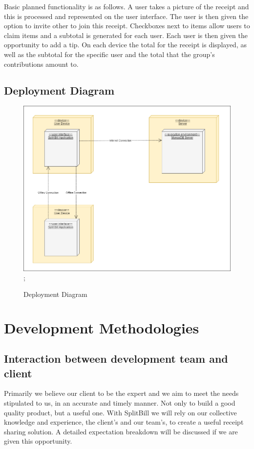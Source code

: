 \documentclass[12pt,a4paper]{article}
\begin{document}
   Basic planned functionality is as follows. A user takes a picture of the receipt and this is processed and represented on the user interface. The user is then given the option to invite other to join this receipt. Checkboxes
   next to items allow users to claim items and a subtotal is generated for each user. Each user is then given the opportunity to add a tip. On each device the total for the receipt is displayed, as well as the subtotal for the
   specific user and the total that the group's contributions amount to.

   \clearpage
   \subsection{Deployment Diagram}
   \begin{figure}[h]
   \includegraphics[width=\textwidth]{SplitBill_deployment.png};
   \caption{Deployment Diagram}
   \end{figure}

   \section{Development Methodologies}
   \subsection{Interaction between development team and client}
   Primarily we believe our client to be the expert and we aim to meet the needs stipulated to us, in an accurate and timely manner. Not only to build a good quality product, but a useful one. With SplitBill we will rely on our
   collective knowledge and experience, the client's and our team's, to create a useful receipt sharing solution. A detailed expectation breakdown will be discussed if we are given this opportunity.
\end{document}
